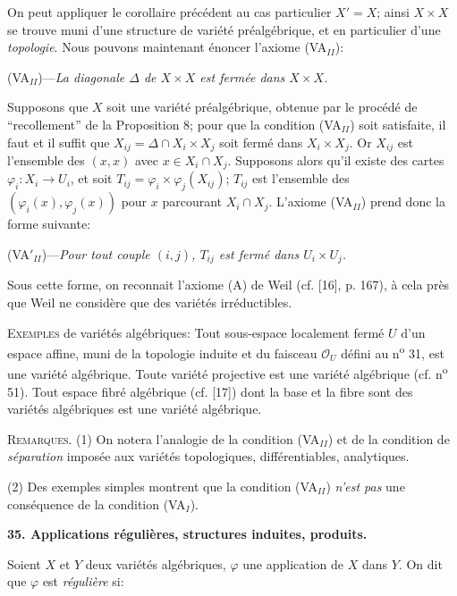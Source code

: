 On peut appliquer le corollaire précédent au cas particulier $X' = X$; ainsi $X \times X$ se trouve muni d'une structure de variété préalgébrique, et en particulier d'une \textit{topologie}. Nous pouvons maintenant énoncer l'axiome (VA$_{II}$):

(VA$_{II}$)---\textit{La diagonale $\Delta$ de $X \times X$ est fermée dans $X \times X$.}

Supposons que $X$ soit une variété préalgébrique, obtenue par le procédé de ``recollement'' de la Proposition 8; pour que la condition (VA$_{II}$) soit satisfaite, il faut et il suffit que $X_{ij} = \Delta \cap X_i \times X_j$ soit fermé dans $X_i \times X_j$. Or $X_{ij}$ est l'ensemble des $(x, x)$ avec $x \in X_i \cap X_j$. Supposons alors qu'il existe des cartes $\varphi_i : X_i \to U_i$, et soit $T_{ij} = \varphi_i \times \varphi_j(X_{ij})$; $T_{ij}$ est l'ensemble des $(\varphi_i(x), \varphi_j(x))$ pour $x$ parcourant $X_i \cap X_j$. L'axiome (VA$_{II}$) prend donc la forme suivante:

(VA$'_{II}$)---\textit{Pour tout couple $(i, j)$, $T_{ij}$ est fermé dans $U_i \times U_j$.}

Sous cette forme, on reconnait l'axiome (A) de Weil (cf. [16], p. 167), à cela près que Weil ne considère que des variétés irréductibles.

\textsc{Exemples} de variétés algébriques: Tout sous-espace localement fermé $U$ d'un espace affine, muni de la topologie induite et du faisceau $\mathcal{O}_U$ défini au n\textsuperscript{o} 31, est une variété algébrique. Toute variété projective est une variété algébrique (cf. n\textsuperscript{o} 51). Tout espace fibré algébrique (cf. [17]) dont la base et la fibre sont des variétés algébriques est une variété algébrique.



\textsc{Remarques}. (1) On notera l'analogie de la condition (VA$_{II}$) et de la condition de \textit{séparation} imposée aux variétés topologiques, différentiables, analytiques.

(2) Des exemples simples montrent que la condition (VA$_{II}$) \textit{n'est pas} une conséquence de la condition (VA$_I$).


\textbf{35. Applications régulières, structures induites, produits.}

Soient $X$ et $Y$ deux variétés algébriques, $\varphi$ une application de $X$ dans $Y$. On dit que $\varphi$ est \textit{régulière} si:

